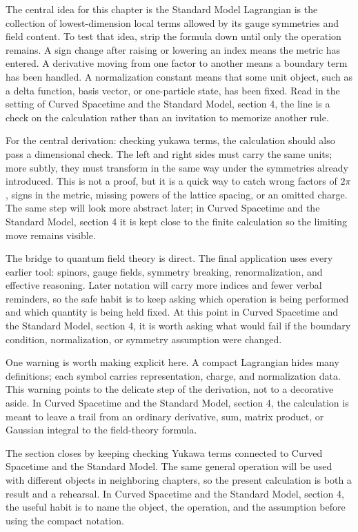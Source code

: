 The central idea for this chapter is the Standard Model Lagrangian is the collection of lowest-dimension local terms allowed by its gauge symmetries and field content.  To test that idea, strip the formula down until only the operation remains.  A sign change after raising or lowering an index means the metric has entered.  A derivative moving from one factor to another means a boundary term has been handled.  A normalization constant means that some unit object, such as a delta function, basis vector, or one-particle state, has been fixed.  Read in the setting of Curved Spacetime and the Standard Model, section 4, the line is a check on the calculation rather than an invitation to memorize another rule.

For the central derivation: checking yukawa terms, the calculation should also pass a dimensional check.  The left and right sides must carry the same units; more subtly, they must transform in the same way under the symmetries already introduced.  This is not a proof, but it is a quick way to catch wrong factors of \(2\pi\), signs in the metric, missing powers of the lattice spacing, or an omitted charge.  The same step will look more abstract later; in Curved Spacetime and the Standard Model, section 4 it is kept close to the finite calculation so the limiting move remains visible.

The bridge to quantum field theory is direct.  The final application uses every earlier tool: spinors, gauge fields, symmetry breaking, renormalization, and effective reasoning.  Later notation will carry more indices and fewer verbal reminders, so the safe habit is to keep asking which operation is being performed and which quantity is being held fixed.  At this point in Curved Spacetime and the Standard Model, section 4, it is worth asking what would fail if the boundary condition, normalization, or symmetry assumption were changed.

One warning is worth making explicit here.  A compact Lagrangian hides many definitions; each symbol carries representation, charge, and normalization data.  This warning points to the delicate step of the derivation, not to a decorative aside.  In Curved Spacetime and the Standard Model, section 4, the calculation is meant to leave a trail from an ordinary derivative, sum, matrix product, or Gaussian integral to the field-theory formula.

The section closes by keeping checking Yukawa terms connected to Curved Spacetime and the Standard Model.  The same general operation will be used with different objects in neighboring chapters, so the present calculation is both a result and a rehearsal.  In Curved Spacetime and the Standard Model, section 4, the useful habit is to name the object, the operation, and the assumption before using the compact notation.



